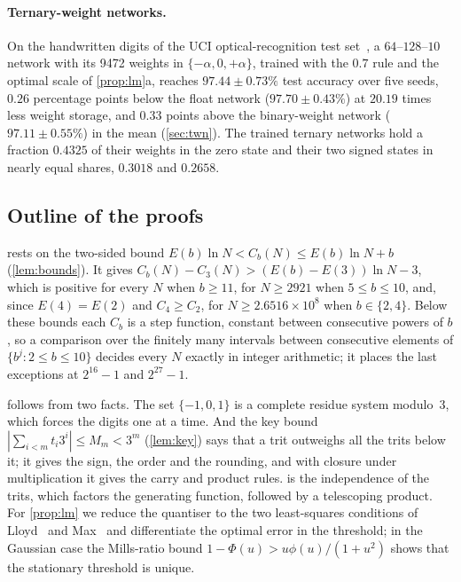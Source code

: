 \documentclass[11pt]{article}
\theoremstyle{definition}\newtheorem{definition}[theorem]{Definition}
\theoremstyle{remark}\newtheorem{remark}[theorem]{Remark}
\begin{document}
\paragraph{Ternary-weight networks.} On the handwritten digits of the UCI optical-recognition test set~\cite{uci_digits}, a $64$--$128$--$10$ network with its 9472 weights in $\{-\alpha,0,+\alpha\}$, trained with the $0.7$ rule and the optimal scale of \cref{prop:lm}a, reaches $97.44\pm0.73\%$ test accuracy over five seeds, $0.26$ percentage points below the float network ($97.70\pm0.43\%$) at $20.19$ times less weight storage, and $0.33$ points above the binary-weight network ($97.11\pm0.55\%$) in the mean (\cref{sec:twn}). The trained ternary networks hold a fraction $0.4325$ of their weights in the zero state and their two signed states in nearly equal shares, $0.3018$ and $0.2658$.

\subsection{Outline of the proofs}
 rests on the two-sided bound $E(b)\ln N<C_b(N)\le E(b)\ln N+b$ (\cref{lem:bounds}). It gives $C_b(N)-C_3(N)>(E(b)-E(3))\ln N-3$, which is positive for every $N$ when $b\ge11$, for $N\ge2921$ when $5\le b\le10$, and, since $E(4)=E(2)$ and $C_4\ge C_2$, for $N\ge2.6516\times10^8$ when $b\in\{2,4\}$. Below these bounds each $C_b$ is a step function, constant between consecutive powers of $b$, so a comparison over the finitely many intervals between consecutive elements of $\{b^j:2\le b\le10\}$ decides every $N$ exactly in integer arithmetic; it places the last exceptions at $2^{16}-1$ and $2^{27}-1$.

 follows from two facts. The set $\{-1,0,1\}$ is a complete residue system modulo~$3$, which forces the digits one at a time. And the key bound $|\sum_{i<m}t_i3^i|\le M_m<3^m$ (\cref{lem:key}) says that a trit outweighs all the trits below it; it gives the sign, the order and the rounding, and with closure under multiplication it gives the carry and product rules.  is the independence of the trits, which factors the generating function, followed by a telescoping product. For \cref{prop:lm} we reduce the quantiser to the two least-squares conditions of Lloyd~\cite{lloyd1982} and Max~\cite{max1960} and differentiate the optimal error in the threshold; in the Gaussian case the Mills-ratio bound $1-\Phi(u)>u\phi(u)/(1+u^2)$ shows that the stationary threshold is unique.
\end{document}
